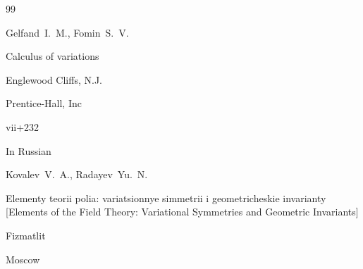 \begin{thebibliography}{99}






\by Gelfand~I.~M., Fomin~S.~V.

\book Calculus of variations


\publaddr Englewood Cliffs, N.J.

\publ Prentice-Hall, Inc

\totalpages vii+232 





\lang In Russian

\by Kovalev~V.~A., Radayev~Yu.~N.

\book Elementy teorii polia: variatsionnye simmetrii i geometricheskie invarianty \rm [Elements of the Field Theory: Variational Symmetries and Geometric Invariants]


\publ Fizmatlit

\publaddr Moscow




\end{thebibliography}



\renewcommand{\baselinestretch}{0.9}





%










